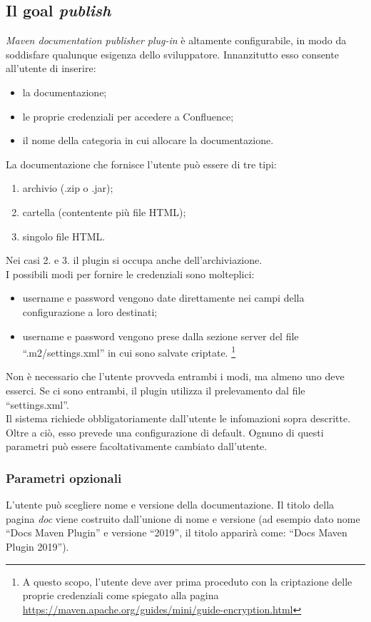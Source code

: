 \subsection{Il goal \emph{publish}} \label{goalPublish}
\emph{Maven documentation publisher plug-in} è altamente configurabile, in modo da soddisfare qualunque esigenza dello sviluppatore.
Innanzitutto esso consente all'utente di inserire:
\begin{itemize}
	\item la documentazione;
	\item le proprie credenziali per accedere a Confluence;	
	\item il nome della categoria in cui allocare la documentazione.
\end{itemize}
La documentazione che fornisce l'utente può essere di tre tipi:
\begin{enumerate}
	\item archivio (.zip o .jar);
	\item cartella (contentente più file HTML);
	\item singolo file HTML.
\end{enumerate}
Nei casi 2. e 3. il plugin si occupa anche dell'archiviazione. \\
I possibili modi per fornire le credenziali sono molteplici:
\begin{itemize}
	\item username e password vengono date direttamente nei campi della configurazione a loro destinati;
	\item username e password vengono prese dalla sezione server del file ``.m2/settings.xml'' in cui sono salvate criptate. \footnote{A questo scopo, l'utente deve aver prima proceduto con la criptazione delle proprie credenziali come spiegato alla pagina \url{https://maven.apache.org/guides/mini/guide-encryption.html}} 
\end{itemize}
Non è necessario che l'utente provveda entrambi i modi, ma almeno uno deve esserci.
Se ci sono entrambi, il plugin utilizza il prelevamento dal file ``settings.xml''. \\

Il sistema richiede obbligatoriamente dall'utente le infomazioni sopra descritte.
Oltre a ciò, esso prevede una configurazione di default.
Ognuno di questi parametri può essere facoltativamente cambiato dall'utente. 

	\subsubsection{Parametri opzionali} \label{parametriOpzionali}
	L'utente può scegliere nome e versione della documentazione.
	Il titolo della pagina \emph{doc} viene costruito dall'unione di nome e versione (ad esempio dato nome ``Docs Maven Plugin'' e versione ``2019'', il titolo apparirà come: ``Docs Maven Plugin 2019'').


